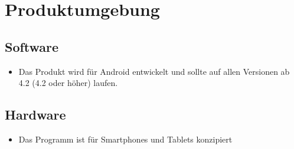 \section{Produktumgebung}

\subsection{Software}
\begin{itemize}
	\item Das Produkt wird für Android entwickelt und sollte auf allen Versionen ab 4.2 (4.2 oder höher) laufen.
\end{itemize}

\subsection{Hardware}
\begin{itemize}
	\item Das Programm ist für Smartphones und Tablets konzipiert
\end{itemize}
